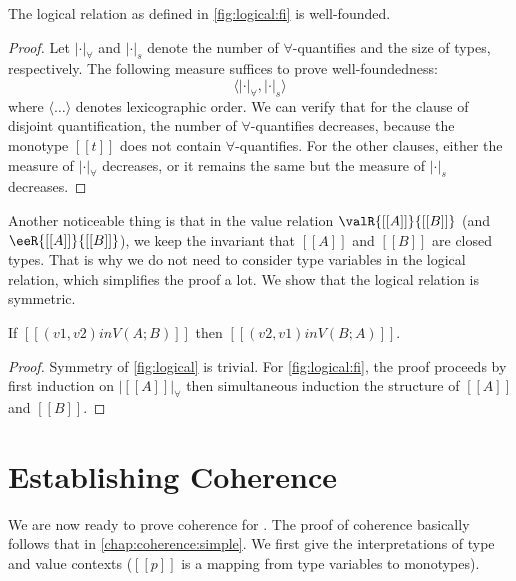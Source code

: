 \begin{lemma}
  The logical relation as defined in \cref{fig:logical:fi} is well-founded.
\end{lemma}
\begin{proof}
  Let $| \cdot |_{\forall}$ and $| \cdot |_s$ denote the number of
  $\forall$-quantifies and the size of types, respectively. The following
  measure suffices to prove well-foundedness:
  \[
\langle | \cdot |_{\forall} ,  | \cdot |_s   \rangle
  \]
  where $\langle \dots \rangle$ denotes lexicographic order. We can verify that
  for the clause of disjoint quantification, the number of $\forall$-quantifies
  decreases, because the monotype $[[t]]$ does not contain $\forall$-quantifies.
  For the other clauses, either the measure of $| \cdot |_{\forall}$ decreases,
  or it remains the same but the measure of $| \cdot |_s$ decreases.
\end{proof}


Another noticeable thing is that in the value relation $ \valR{[[A]]}{[[B]]} $
(and $\eeR{[[A]]}{[[B]]} $), we keep the invariant that $[[A]]$ and $[[B]]$
are closed types. That is why we do not need to consider type variables in the
logical relation, which simplifies the proof a lot. We show that the logical
relation is symmetric.


\begin{lemma}
  If $[[ (v1, v2) in V ( A ; B ) ]]$ then $[[ (v2, v1) in V ( B ; A ) ]]$.
\end{lemma}
\begin{proof}
  Symmetry of \cref{fig:logical} is trivial. For \cref{fig:logical:fi}, the
  proof proceeds by first induction on $ | [[A]] |_{\forall} $ then simultaneous
  induction the structure of $[[A]]$ and $[[B]]$.
\end{proof}

\section{Establishing Coherence}

We are now ready to prove coherence for \fnamee. The proof of coherence
basically follows that in \cref{chap:coherence:simple}. We first give the
interpretations of type and value contexts ($[[p]]$ is a mapping from type
variables to monotypes).

\begin{definition}
\end{definition}


